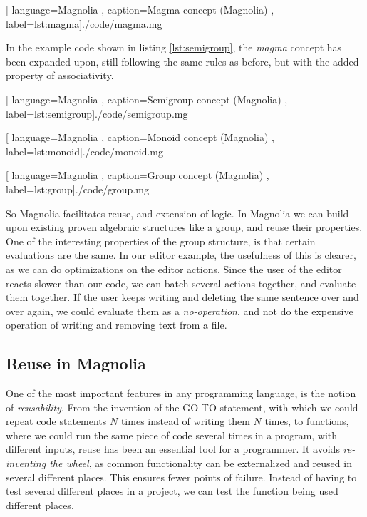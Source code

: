 \begin{center}
  
    [ language=Magnolia
    , caption={Magma concept (Magnolia)}
    , label=lst:magma]{./code/magma.mg}
\end{center}

In the example code shown in listing \ref{lst:semigroup}, the \textit{magma}
concept has been expanded upon, still following the same rules as before, but
with the added property of associativity.

\begin{center}
  
    [ language=Magnolia
    , caption={Semigroup concept (Magnolia)}
    , label=lst:semigroup]{./code/semigroup.mg}
\end{center}

\begin{center}
  
    [ language=Magnolia
    , caption={Monoid concept (Magnolia)}
    , label=lst:monoid]{./code/monoid.mg}
\end{center}

\begin{center}
  
    [ language=Magnolia
    , caption={Group concept (Magnolia)}
    , label=lst:group]{./code/group.mg}
\end{center}

So Magnolia facilitates reuse, and extension of logic. In Magnolia we can build
upon existing proven algebraic structures like a group, and reuse their
properties. One of the interesting properties of the group structure, is that
certain evaluations are the same. In our editor example, the usefulness of this
is clearer, as we can do optimizations on the editor actions. Since the user of
the editor reacts slower than our code, we can batch several actions together,
and evaluate them together. If the user keeps writing and deleting the same
sentence over and over again, we could evaluate them as a
\textit{no-operation}, and not do the expensive operation of writing and
removing text from a file.


\subsection{Reuse in Magnolia}

One of the most important features in any programming language, is the notion
of \textit{reusability}. From the invention of the GO-TO-statement, with which
we could repeat code statements $N$ times instead of writing them $N$ times, to
functions, where we could run the same piece of code several times in a
program, with different inputs, reuse has been an essential tool for a
programmer. It avoids \textit{re-inventing the wheel}, as common functionality
can be externalized and reused in several different places. This ensures
fewer points of failure. Instead of having to test several different places in
a project, we can test the function being used different places.

